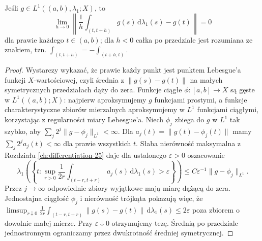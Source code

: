 \begin{lemat}
\label{lem:bochner-differentiation-30}
Jeśli $g\in L^1((a,b),\lambda_1;X)$, to
\[
 \lim_{h\to0}\left\|
 \frac1h\int_{(t,t+h)}g(s)\,\mathrm d\lambda_1(s)-g(t)
 \right\|=0
\]
dla prawie każdego $t\in(a,b)$; dla $h<0$ całka
po przedziale jest rozumiana ze znakiem, tzn.
$\int_{(t,t+h)}=-\int_{(t+h,t)}$.
\end{lemat}
\begin{proof}
Wystarczy wykazać, że prawie każdy punkt jest
punktem Lebesgue'a funkcji $X$-wartościowej, czyli
średnia z $\|g(s)-g(t)\|$ na małych symetrycznych
przedziałach dąży do zera. Funkcje ciągłe
$\phi:[a,b]\to X$ są gęste w $L^1((a,b);X)$:
najpierw aproksymujemy $g$ funkcjami prostymi,
a funkcje charakterystyczne zbiorów mierzalnych
aproksymujemy w $L^1$ funkcjami ciągłymi,
korzystając z regularności miary Lebesgue'a.
Niech $\phi_j$ zbiega do $g$ w $L^1$ tak szybko, aby
$\sum_j2^j\|g-\phi_j\|_{L^1}<\infty$.
Dla $a_j(t)=\|g(t)-\phi_j(t)\|$ mamy
$\sum_j2^j a_j(t)<\infty$ dla prawie wszystkich $t$.
Słaba nierówność maksymalna z Rozdziału
\ref{ch:differentiation-25} daje dla ustalonego
$\varepsilon>0$ oszacowanie
\[
 \lambda_1\!\left(\left\{t:
 \sup_{r>0}\frac1{2r}\int_{(t-r,t+r)}a_j(s)
 \,\mathrm d\lambda_1(s)>\varepsilon\right\}\right)
 \le C\varepsilon^{-1}\|g-\phi_j\|_{L^1}.
\]
Przez $j\to\infty$ odpowiednie zbiory wyjątkowe
mają miarę dążącą do zera. Jednostajna ciągłość
$\phi_j$ i nierówność trójkąta pokazują więc, że
$\limsup_{r\downarrow0}\frac1{2r}\int_{(t-r,t+r)}
\|g(s)-g(t)\|\,\mathrm d\lambda_1(s)\le2\varepsilon$
poza zbiorem o dowolnie małej mierze.
Przy $\varepsilon\downarrow0$ otrzymujemy tezę.
Średnią po przedziale jednostronnym ograniczamy
przez dwukrotność średniej symetrycznej.
\end{proof}

